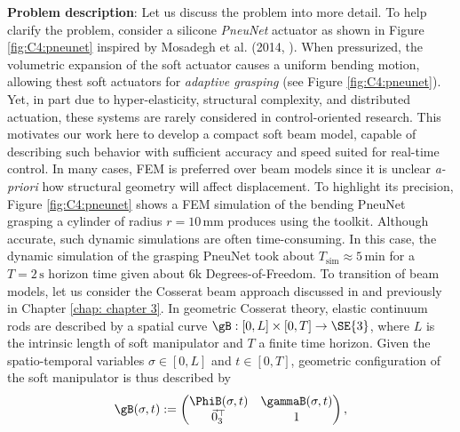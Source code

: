 \textbf{Problem description}: Let us discuss the problem into more detail. To help clarify the problem, consider a silicone \textit{PneuNet} actuator as shown in Figure \ref{fig:C4:pneunet} inspired by Mosadegh et al. (2014, \cite{Mosadegh2014}). When pressurized, the volumetric expansion of the soft actuator causes a uniform bending motion, allowing thest soft actuators for \textit{adaptive grasping} (see Figure \ref{fig:C4:pneunet}). Yet, in part due to hyper-elasticity, structural complexity, and distributed actuation, these systems are rarely considered in control-oriented research. This motivates our work here to develop a compact soft beam model, capable of describing such behavior with sufficient accuracy and speed suited for real-time control. In many cases, FEM is preferred over beam models since it is unclear \textit{a-priori} how structural geometry will affect displacement. To highlight its precision, Figure \ref{fig:C4:pneunet} shows a FEM simulation of the bending PneuNet grasping a cylinder of radius $r = 10 \, \si{\milli \meter}$ produces using the \sorotoki  toolkit. Although accurate, such dynamic simulations are often time-consuming. In this case, the dynamic simulation of the grasping PneuNet took about $T_\textrm{sim} \approx 5 \,\si{\minute}$ for a $T = 2 \,\si{\second}$ horizon time given about 6k Degrees-of-Freedom.
%    
To transition of beam models, let us consider the Cosserat beam approach discussed in \cite{Boyer2021,Caasenbrood2021} and previously in Chapter \ref{chap: chapter 3}. In geometric Cosserat theory, elastic continuum rods are described by a spatial curve $\gB: [0,L] \times [0,T] \to \SE{3}$, where $L$ is the intrinsic length of soft manipulator and $T$ a finite time horizon. Given the spatio-temporal variables $\sigma \in [0,L]$ and $t \in [0,T]$, geometric configuration of the soft manipulator is thus described by
%
\begin{equation}
\gB(\sigma,t) :=  \begin{pmatrix}
\PhiB(\sigma,t) & \gammaB(\sigma,t) \\
\vec{0}_3^\top & 1
\end{pmatrix},
\label{eq:C4:g}
\end{equation}
